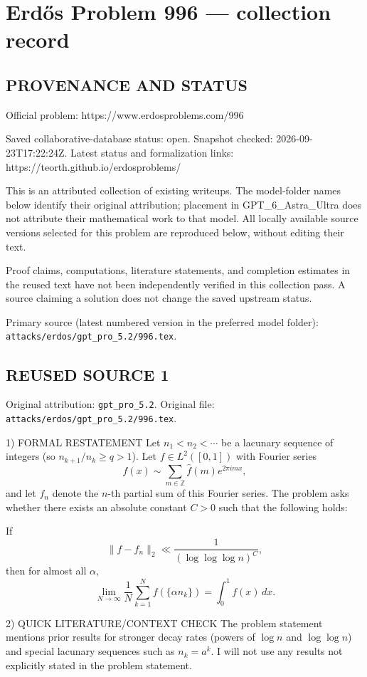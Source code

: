 \section*{Erd\H{o}s Problem 996 --- collection record}

\subsection*{PROVENANCE AND STATUS}
Official problem: https://www.erdosproblems.com/996

Saved collaborative-database status: open.
Snapshot checked: 2026-09-23T17:22:24Z.
Latest status and formalization links: https://teorth.github.io/erdosproblems/

This is an attributed collection of existing writeups. The model-folder names below identify their original attribution; placement in GPT\_6\_Astra\_Ultra does not attribute their mathematical work to that model. All locally available source versions selected for this problem are reproduced below, without editing their text.

Proof claims, computations, literature statements, and completion estimates in the reused text have not been independently verified in this collection pass. A source claiming a solution does not change the saved upstream status.

Primary source (latest numbered version in the preferred model folder): \texttt{attacks/erdos/gpt\_pro\_5.2/996.tex}.

\subsection*{REUSED SOURCE 1}
Original attribution: \texttt{gpt\_pro\_5.2}.
Original file: \texttt{attacks/erdos/gpt\_pro\_5.2/996.tex}.


1) FORMAL RESTATEMENT
Let $n_1<n_2<\cdots$ be a lacunary sequence of integers (so $n_{k+1}/n_k\ge q>1$).  Let $f\in L^2([0,1])$ with Fourier series
\[
 f(x)\sim \sum_{m\in\mathbb{Z}} \widehat f(m)e^{2\pi i m x},
\]
and let $f_n$ denote the $n$-th partial sum of this Fourier series.  The problem asks whether there exists an absolute constant $C>0$ such that the following holds:

If
\[
 \|f-f_n\|_2 \ll \frac{1}{(\log\log\log n)^C},
\]
then for almost all $\alpha$,
\[
 \lim_{N\to\infty}\frac{1}{N}\sum_{k=1}^N f(\{\alpha n_k\}) = \int_0^1 f(x)\,dx.
\]

2) QUICK LITERATURE/CONTEXT CHECK
The problem statement mentions prior results for stronger decay rates (powers of $\log n$ and $\log\log n$) and special lacunary sequences such as $n_k=a^k$.  I will not use any results not explicitly stated in the problem statement.

